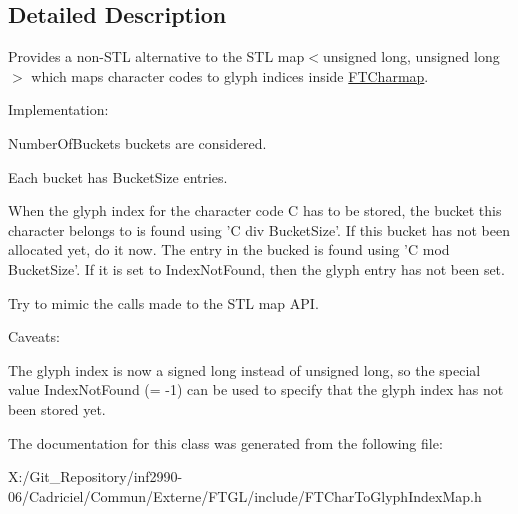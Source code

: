 \subsection{Detailed Description}
Provides a non-\/\-S\-T\-L alternative to the S\-T\-L map$<$unsigned long, unsigned long$>$ which maps character codes to glyph indices inside \hyperlink{class_f_t_charmap}{F\-T\-Charmap}.

Implementation\-:
\begin{DoxyItemize}
\item Number\-Of\-Buckets buckets are considered.
\item Each bucket has Bucket\-Size entries.
\item When the glyph index for the character code C has to be stored, the bucket this character belongs to is found using 'C div Bucket\-Size'. If this bucket has not been allocated yet, do it now. The entry in the bucked is found using 'C mod Bucket\-Size'. If it is set to Index\-Not\-Found, then the glyph entry has not been set.
\item Try to mimic the calls made to the S\-T\-L map A\-P\-I.
\end{DoxyItemize}

Caveats\-:
\begin{DoxyItemize}
\item The glyph index is now a signed long instead of unsigned long, so the special value Index\-Not\-Found (= -\/1) can be used to specify that the glyph index has not been stored yet. 
\end{DoxyItemize}

The documentation for this class was generated from the following file\-:\begin{DoxyCompactItemize}
\item 
X\-:/\-Git\-\_\-\-Repository/inf2990-\/06/\-Cadriciel/\-Commun/\-Externe/\-F\-T\-G\-L/include/F\-T\-Char\-To\-Glyph\-Index\-Map.\-h\end{DoxyCompactItemize}

